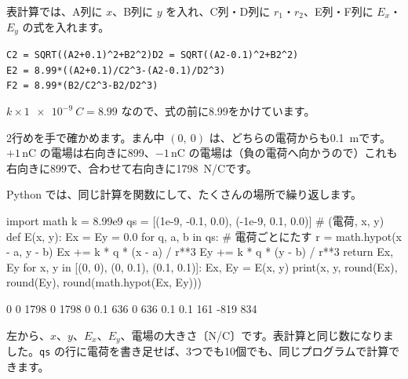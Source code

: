 表計算では、A列に $x$、B列に $y$ を入れ、C列・D列に $r_1$・$r_2$、E列・F列に $E_x$・$E_y$ の式を入れます。
\begin{bkcenter}\small
\texttt{C2 = SQRT((A2+0.1)\textasciicircum2+B2\textasciicircum2)}\quad\texttt{D2 = SQRT((A2-0.1)\textasciicircum2+B2\textasciicircum2)}\\
\texttt{E2 = 8.99*((A2+0.1)/C2\textasciicircum3-(A2-0.1)/D2\textasciicircum3)}\\
\texttt{F2 = 8.99*(B2/C2\textasciicircum3-B2/D2\textasciicircum3)}
\end{bkcenter}
$k\times\qty{1e-9}{C}=8.99$ なので、式の前に8.99をかけています。

\begin{bkcenter}
\label{ph:電-1:tab-sheet}
\end{bkcenter}

\noindent 2行めを手で確かめます。まん中 $(0,\ 0)$ は、どちらの電荷からも\qty{0.1}{m}です。$+1$\,nC の電場は右向きに899、$-1$\,nC の電場は（負の電荷へ向かうので）これも右向きに899で、合わせて右向きに\qty{1798}{N/C}です。

\noindent Python では、同じ計算を関数にして、たくさんの場所で繰り返します。
\begin{phcode}[Python]
import math
k = 8.99e9
qs = [(1e-9, -0.1, 0.0), (-1e-9, 0.1, 0.0)]   \# (電荷, x, y)
def E(x, y):
    Ex = Ey = 0.0
    for q, a, b in qs:                         \# 電荷ごとにたす
        r = math.hypot(x - a, y - b)
        Ex += k * q * (x - a) / r**3
        Ey += k * q * (y - b) / r**3
    return Ex, Ey
for x, y in [(0, 0), (0, 0.1), (0.1, 0.1)]:
    Ex, Ey = E(x, y)
    print(x, y, round(Ex), round(Ey), round(math.hypot(Ex, Ey)))
\end{phcode}
\begin{phcodeout}
0 0 1798 0 1798
0 0.1 636 0 636
0.1 0.1 161 -819 834
\end{phcodeout}
左から、$x$、$y$、$E_x$、$E_y$、電場の大きさ〔N/C〕です。表計算と同じ数になりました。\texttt{qs} の行に電荷を書き足せば、3つでも10個でも、同じプログラムで計算できます。

